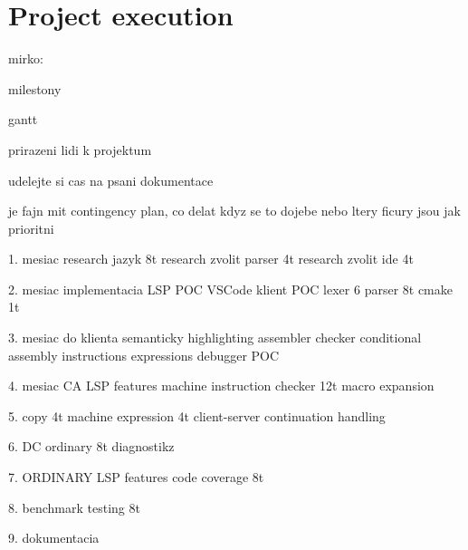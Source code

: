\chapter{Project execution}

mirko:

milestony

gantt

prirazeni lidi k projektum

udelejte si cas na psani dokumentace

je fajn mit contingency plan, co delat kdyz se to dojebe nebo ltery ficury jsou jak prioritni



1. mesiac 
	research jazyk 8t
	research zvolit parser 4t
	research zvolit ide 4t
	
	
	
2. mesiac
	implementacia LSP POC
		VSCode klient POC
	lexer 6
	parser 8t
	cmake 1t
	
	
	
	
3. mesiac
	do klienta semanticky highlighting
	assembler checker
	conditional assembly 
		instructions
		expressions
	debugger POC
	
	
4. mesiac
	CA LSP features
	machine instruction checker 12t
	macro expansion
	
5. 
	copy 4t
	machine expression 4t
	client-server continuation handling
	
6.
	DC
	ordinary 8t
	diagnostikz
	
	
7.	
	ORDINARY LSP features
	code coverage 8t
	
8. 
	benchmark
	testing 8t	
	
9.
	dokumentacia
